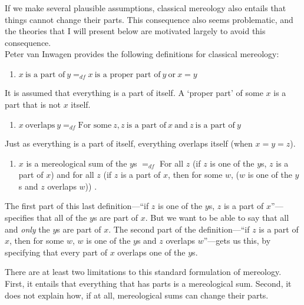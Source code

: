 \documentclass[11pt]{article}
\newenvironment{squote}{%
\begin{spacing}{1}
\begin{list}{}{%
\setlength{\labelwidth}{0pt}%
\rightmargin\leftmargin%
}
\item\relax
}{%
\end{list}%
\end{spacing}
}
\begin{document}
\begin{spacing}{1.5}
If we make several plausible assumptions, classical mereology also
entails that things cannot change their parts.  This consequence also
seems problematic, and the theories that I will present below are
motivated largely to avoid this consequence. \\

Peter van Inwagen provides the following definitions for classical
mereology:

\begin{enumerate}
  \item $x\ \text{is a part of}\ y =_{df} x\ \text{is a proper part
    of}\ y\ \text{or}\ x = y$
\end{enumerate}

It is assumed that everything is a part of itself.  A `proper part' of
some $x$ is a part that is not $x$ itself.

\begin{enumerate}[start=2]
  \item $x\ \text{overlaps}\ y =_{df} \text{For some}\ z, z\ \text{is
    a part of}\ x\ \text{and}\ z\ \text{is a part of}\ y$
\end{enumerate}

Just as everything is a part of itself, everything overlaps itself
(when $x = y = z$).

\begin{enumerate}[start=3]
  \item $x$ is a mereological sum of the $y$s $=_{df}$ For all $z$ (if
    $z$ is one of the $y$s, $z$ is a part of $x$) and for all $z$ (if
    $z$ is a part of $x$, then for some $w$, ($w$ is one of the $y$s
    and $z$ overlaps $w$)) \citeyearpar[618--619]{inwagen2006}.
\end{enumerate}

The first part of this last definition---``if $z$ is one of the $y$s,
$z$ is a part of $x$''---specifies that all of the $y$s are part of
$x$.  But we want to be able to say that all and {\em only} the $y$s
are part of $x$.  The second part of the definition---``if $z$ is a
part of $x$, then for some $w$, $w$ is one of the $y$s and $z$
overlaps $w$''---gets us this, by specifying that every part of $x$
overlaps one of the $y$s.


There are at least two limitations to this standard formulation of
mereology.  First, it entails that everything that has parts is a
mereological sum.  Second, it does not explain how, if at all,
mereological sums can change their parts.


\end{spacing}
\end{document}
